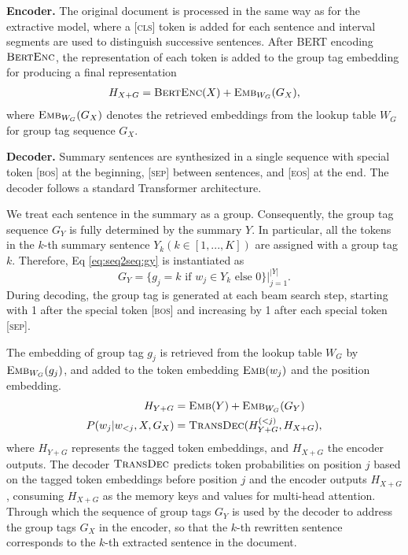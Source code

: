 \documentclass[letterpaper]{article} %
\begin{document}
{\bf Encoder.}
The original document is processed in the same way as for the extractive model, where a \textsc{[cls]} token is added for each sentence and interval segments are used to distinguish successive sentences. 
After BERT encoding $\textsc{BertEnc}$, the representation of each token is added to the group tag embedding for producing a final representation
\begin{equation}
\begin{split}
  H_{X+G} &= \textsc{BertEnc}(X) + \textsc{Emb}_{W_G}(G_X),  \\
\end{split}
\end{equation}
where $\textsc{Emb}_{W_G}(G_X)$ denotes the retrieved embeddings from the lookup table $W_G$ for group tag sequence $G_X$.


{\bf Decoder.}
Summary sentences are synthesized in a single sequence with special token \textsc{[bos]} at the beginning, \textsc{[sep]} between sentences, and \textsc{[eos]} at the end. The decoder follows a standard Transformer architecture. 

We treat each sentence in the summary as a group. Consequently, the group tag sequence $G_Y$ is fully determined by the summary $Y$. In particular, all the tokens in the $k$-th summary sentence $Y_k (k \in [1,...,K])$ are assigned with a group tag $k$. Therefore, Eq \ref{eq:seq2seq:gy} is instantiated as 
\begin{equation}
    G_Y = \{g_j = k \text{ if } w_j \in Y_k \text{ else } 0\}|^{|Y|}_{j=1}.
\label{eq:grouptag:gy}
\end{equation}
During decoding, the group tag is generated at each beam search step, starting with 1 after the special token \textsc{[bos]} and increasing by 1 after each special token \textsc{[sep]}.

The embedding of group tag $g_j$ is retrieved from the lookup table $W_G$ by $\textsc{Emb}_{W_G}(g_j)$, and added to the token embedding $\textsc{Emb}(w_j)$ and the position embedding. 
\begin{equation}
\begin{split}
  H_{Y+G} &= \textsc{Emb}(Y) + \textsc{Emb}_{W_G}(G_Y)  \\
  P(w_j|w_{<j},X,G_X) & = \textsc{TransDec}(H_{Y+G}^{(<j)}, H_{X+G}), \\
\end{split}
\label{eq:rewrite}
\end{equation}
where $H_{Y+G}$ represents the tagged token embeddings, and $H_{X+G}$ the encoder outputs. The decoder $\textsc{TransDec}$ predicts token probabilities on position $j$ based on the tagged token embeddings before position $j$ and the encoder outputs $H_{X+G}$, consuming $H_{X+G}$ as the memory keys and values for multi-head attention.
Through which the sequence of group tags $G_Y$ is used by the decoder to address the group tags $G_X$ in the encoder, so that the $k$-th rewritten sentence corresponds to the $k$-th extracted sentence in the document. 
\end{document}

